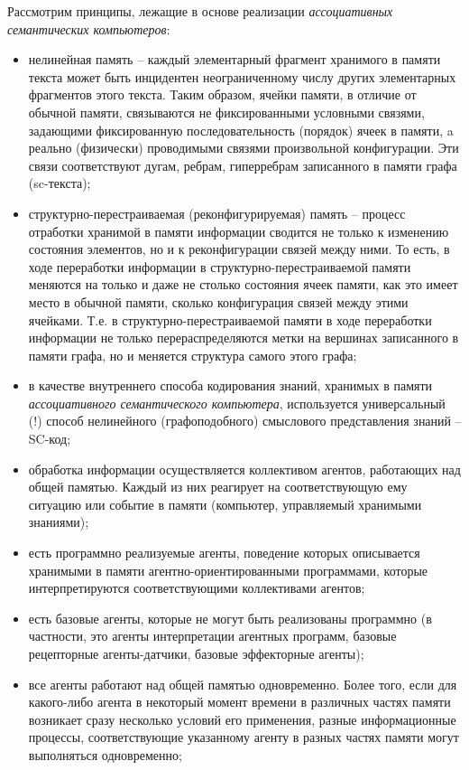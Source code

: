 Рассмотрим принципы, лежащие в основе реализации \textit{ассоциативных семантических компьютеров}:
\begin{itemize}
	\item нелинейная память -- каждый элементарный фрагмент хранимого в памяти текста может быть инцидентен неограниченному числу других элементарных фрагментов этого текста. Таким образом, ячейки памяти, в отличие от обычной памяти, связываются не фиксированными условными связями, задающими фиксированную последовательность (порядок) ячеек в памяти, a реально (физически) проводимыми связями произвольной конфигурации. Эти связи соответствуют дугам, ребрам, гиперребрам записанного в памяти графа (sc-текста);
	\item структурно-перестраиваемая (реконфигурируемая) память -- процесс отработки хранимой в памяти информации сводится не только к изменению состояния элементов, но и к реконфигурации связей между ними. То есть, в ходе переработки информации в структурно-перестраиваемой памяти меняются на только и даже не столько состояния ячеек памяти, как это имеет место в обычной памяти, сколько конфигурация связей между этими ячейками. Т.е. в структурно-перестраиваемой памяти в ходе переработки информации не только перераспределяются метки на вершинах записанного в памяти графа, но и меняется структура самого этого графа;	
	\item в качестве внутреннего способа кодирования знаний, хранимых в памяти \textit{ассоциативного семантического компьютера}, используется универсальный (!) способ нелинейного (графоподобного) смыслового представления знаний -- SC-код;
	\item обработка информации осуществляется коллективом агентов, работающих над общей памятью. Каждый из них реагирует на соответствующую ему ситуацию или событие в памяти (компьютер, управляемый хранимыми знаниями);
	\item есть программно реализуемые агенты, поведение которых описывается хранимыми в памяти агентно-ориентированными программами, которые интерпретируются соответствующими коллективами агентов;
	\item есть базовые агенты, которые не могут быть реализованы программно (в частности, это агенты интерпретации агентных программ, базовые рецепторные агенты-датчики, базовые эффекторные агенты);
	\item все агенты работают над общей памятью одновременно. Более того, если для какого-либо агента в некоторый момент времени в различных частях памяти возникает сразу несколько условий его применения, разные информационные процессы, соответствующие указанному агенту в разных частях памяти могут выполняться одновременно;

\end{itemize}
